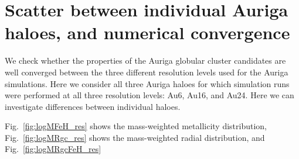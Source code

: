 \documentclass[a4paper,fleqn,usenatbib]{mnras}
\begin{document}







\clearpage
\appendix
\section{Scatter between individual Auriga haloes, and numerical convergence} 
\label{sec:scatter-convergence}
We check whether the properties of the Auriga globular cluster candidates 
are well converged between the three different resolution levels used for the 
Auriga simulations. Here we consider all three Auriga haloes for which simulation
runs were performed at all three resolution levels: Au6, Au16, and Au24. Here
we can investigate differences between individual haloes. 

Fig.~\ref{fig:logMFeH_res} shows the mass-weighted metallicity distribution, 
Fig.~\ref{fig:logMRgc_res} shows the mass-weighted radial distribution, and
Fig.~\ref{fig:logMRgcFeH_res}
\end{document}
